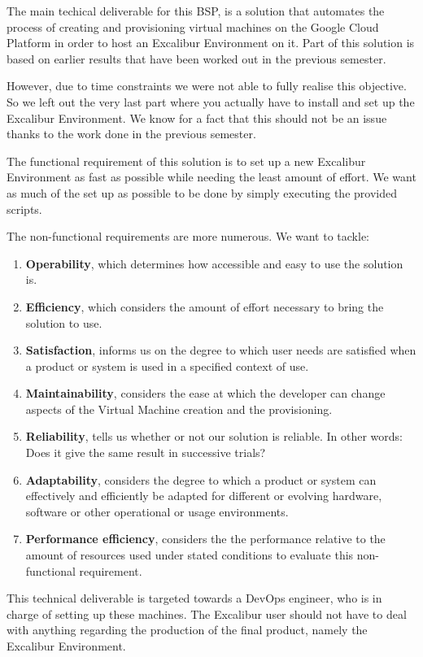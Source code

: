 The main techical deliverable for this BSP, is a solution that
automates the process of creating and provisioning virtual machines on
the Google Cloud Platform in order to host an Excalibur Environment on
it. Part of this solution is based on earlier results that have been
worked out in the previous semester. 

However, due to time constraints we were not able to fully realise
this objective. So we left out the very last part where you actually
have to install and set up the Excalibur Environment. We know for a
fact that this should not be an issue thanks to the work done in the
previous semester.

The functional requirement of this solution is to set up a new
Excalibur Environment as fast as possible while needing the least
amount of effort. We want as much of the set up as possible to be done
by simply executing the provided scripts.

The non-functional requirements are more numerous. We want to tackle:
\begin{enumerate}

	\item \textbf{Operability}\cite{ISO-IEC}, which determines how
	accessible and easy to use the solution is.

	\item \textbf{Efficiency}\cite{ISO-IEC}, which considers the
	amount of effort necessary to bring the solution to use.
		
	\item \textbf{Satisfaction}\cite{ISO-IEC}, informs us on the
	degree to which user needs are satisfied when a product or system
	is used in a specified context of use.
		
	
	\item \textbf{Maintainability}\cite{ISO-IEC}, considers the ease
	at which the developer can change aspects of the Virtual Machine
	creation and the provisioning.
		
	\item \textbf{Reliability}\cite{ISO-IEC}, tells us whether or not
	our solution is reliable. In other words: Does it give the same
	result in successive trials?

	\item \textbf{Adaptability}\cite{ISO-IEC}, considers the degree to
	which a product or system can effectively and efficiently be
	adapted for different or evolving hardware, software or other
	operational or usage environments.

	\item \textbf{Performance efficiency}\cite{ISO-IEC}, considers the
	the performance relative to the amount of resources used under
	stated conditions to evaluate this non-functional requirement.

		
\end{enumerate}

This technical deliverable is targeted towards a DevOps engineer, who
is in charge of setting up these machines. The Excalibur user should
not have to deal with anything regarding the production of the final
product, namely the Excalibur Environment.

